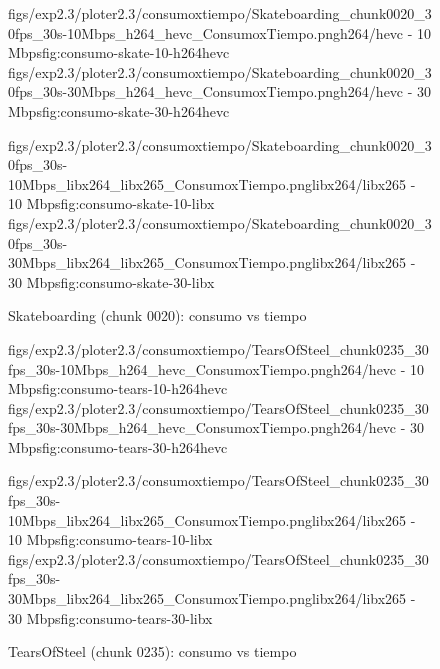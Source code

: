 \begin{figure}[H]
  \centering
  \small
  \dosubfigs
    {figs/exp2.3/ploter2.3/consumoxtiempo/Skateboarding_chunk0020_30fps_30s-10Mbps_h264_hevc_ConsumoxTiempo.png}{h264/hevc - 10 Mbps}{fig:consumo-skate-10-h264hevc}
    {figs/exp2.3/ploter2.3/consumoxtiempo/Skateboarding_chunk0020_30fps_30s-30Mbps_h264_hevc_ConsumoxTiempo.png}{h264/hevc - 30 Mbps}{fig:consumo-skate-30-h264hevc}
  
  \dosubfigs
    {figs/exp2.3/ploter2.3/consumoxtiempo/Skateboarding_chunk0020_30fps_30s-10Mbps_libx264_libx265_ConsumoxTiempo.png}{libx264/libx265 - 10 Mbps}{fig:consumo-skate-10-libx}
    {figs/exp2.3/ploter2.3/consumoxtiempo/Skateboarding_chunk0020_30fps_30s-30Mbps_libx264_libx265_ConsumoxTiempo.png}{libx264/libx265 - 30 Mbps}{fig:consumo-skate-30-libx}
  \caption{Skateboarding (chunk 0020): consumo vs tiempo}
  \label{fig:consumo-skate}
\end{figure}

\begin{figure}[H]
  \centering
  \small
  \dosubfigs
    {figs/exp2.3/ploter2.3/consumoxtiempo/TearsOfSteel_chunk0235_30fps_30s-10Mbps_h264_hevc_ConsumoxTiempo.png}{h264/hevc - 10 Mbps}{fig:consumo-tears-10-h264hevc}
    {figs/exp2.3/ploter2.3/consumoxtiempo/TearsOfSteel_chunk0235_30fps_30s-30Mbps_h264_hevc_ConsumoxTiempo.png}{h264/hevc - 30 Mbps}{fig:consumo-tears-30-h264hevc}
  
  \dosubfigs
    {figs/exp2.3/ploter2.3/consumoxtiempo/TearsOfSteel_chunk0235_30fps_30s-10Mbps_libx264_libx265_ConsumoxTiempo.png}{libx264/libx265 - 10 Mbps}{fig:consumo-tears-10-libx}
    {figs/exp2.3/ploter2.3/consumoxtiempo/TearsOfSteel_chunk0235_30fps_30s-30Mbps_libx264_libx265_ConsumoxTiempo.png}{libx264/libx265 - 30 Mbps}{fig:consumo-tears-30-libx}
  \caption{TearsOfSteel (chunk 0235): consumo vs tiempo}
  \label{fig:consumo-tears}
\end{figure}